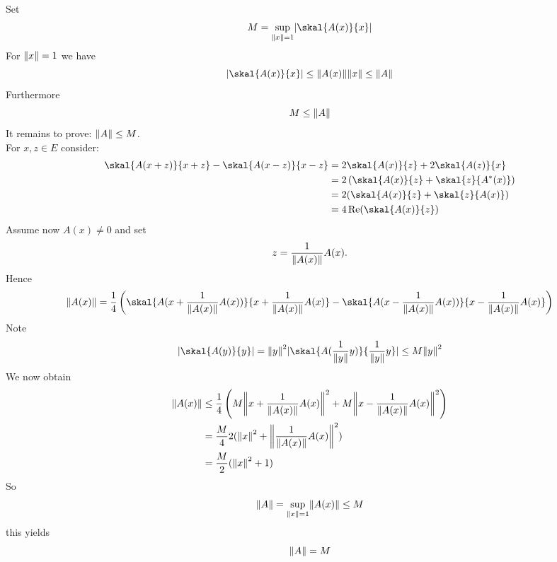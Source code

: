 \begin{beweis}
	Set 
	\[
		M = \sup_{\norm{x}=1} \abs{\skal{A(x)}{x}}
	\]
	For $\norm{x}=1$ we have
	\[
		\abs{\skal{A(x)}{x}} \leq \norm{A(x)} \norm{x} \leq \norm{A}
	\]
	Furthermore
	\[
		M \leq \norm{A}
	\]
	It remains to prove: $\norm{A} \leq M$. \\
	For $x,z \in E$ consider:
	\begin{align*}
		\skal{A(x+z)}{x+z} - \skal{A(x-z)}{x-z} &= 2 \skal{A(x)}{z} + 2 \skal{A(z)}{x} \\
		&= 2 \left( \skal{A(x)}{z} + \skal{z}{A^*(x)} \right) \\
		&= 2 (\skal{A(x)}{z} + \skal{z}{A(x)}) \\
		&= 4 \re( \skal{A(x)}{z})
	\end{align*}
	Assume now $A(x) \neq 0$ and set
	\[
		z = \frac{1}{\norm{A(x)}} A(x).
	\]
	Hence
	\[
		\norm{A(x)} = \frac{1}{4} \left( \skal{A(x+\frac{1}{\norm{A(x)}} A(x))}{x + \frac{1}{\norm{A(x)}} A(x)} 
		- \skal{A(x-\frac{1}{\norm{A(x)}} A(x))}{x- \frac{1}{\norm{A(x)}} A(x)} \right)
	\]
	Note \[
		\abs{\skal{A(y)}{y}} = \norm{y}^2 \abs{\skal{A(\frac{1}{\norm{y}}y)}{ \frac{1}{\norm{y}}y}} \leq M \norm{y}^2
	\]
	We now obtain
	\begin{align*}
		\norm{A(x)} &\leq \frac{1}{4} \left( M \norm{x+\frac{1}{\norm{A(x)}} A(x)}^2 + M \norm{x - \frac{1}{\norm{A(x)}} A(x)}^2 \right) \\
		&= \frac{M}{4} 2( \norm{x}^2 + \norm{\frac{1}{\norm{A(x)}} A(x)}^2) \\
		&= \frac{M}{2} (\norm{x}^2 +1) 
	\end{align*}
	So
	\[
		\norm{A} = \sup_{\norm{x}=1} \norm{A(x)} \leq M
	\]
	this yields
	\[
		\norm{A}= M
	\]
\end{beweis}